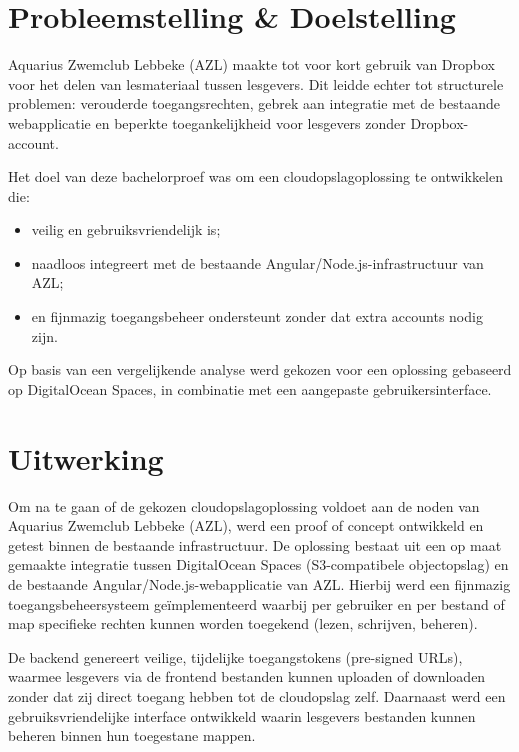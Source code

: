 \documentclass[a0,portrait]{hogent-poster}
\begin{document}
\begin{multicols}{2} %

\section{Probleemstelling \& Doelstelling}  

Aquarius Zwemclub Lebbeke (AZL) maakte tot voor kort gebruik van Dropbox voor het delen van lesmateriaal tussen lesgevers. Dit leidde echter tot structurele problemen: verouderde toegangsrechten, gebrek aan integratie met de bestaande webapplicatie en beperkte toegankelijkheid voor lesgevers zonder Dropbox-account.

Het doel van deze bachelorproef was om een cloudopslagoplossing te ontwikkelen die:
\begin{itemize}
  \item veilig en gebruiksvriendelijk is;
  \item naadloos integreert met de bestaande Angular/Node.js-infrastructuur van AZL;
  \item en fijnmazig toegangsbeheer ondersteunt zonder dat extra accounts nodig zijn.
\end{itemize}

Op basis van een vergelijkende analyse werd gekozen voor een oplossing gebaseerd op DigitalOcean Spaces, in combinatie met een aangepaste gebruikersinterface.

\section{Uitwerking}

Om na te gaan of de gekozen cloudopslagoplossing voldoet aan de noden van Aquarius Zwemclub Lebbeke (AZL), 
werd een proof of concept ontwikkeld en getest binnen de bestaande infrastructuur. De oplossing bestaat uit een op maat gemaakte 
integratie tussen DigitalOcean Spaces (S3-compatibele objectopslag) en de bestaande Angular/Node.js-webapplicatie van AZL. 
Hierbij werd een fijnmazig toegangsbeheersysteem geïmplementeerd waarbij per gebruiker en per bestand of map specifieke rechten 
kunnen worden toegekend (lezen, schrijven, beheren).

De backend genereert veilige, tijdelijke toegangstokens (pre-signed URLs), waarmee lesgevers via de frontend bestanden kunnen uploaden of downloaden 
zonder dat zij direct toegang hebben tot de cloudopslag zelf. Daarnaast werd een gebruiksvriendelijke interface ontwikkeld waarin lesgevers bestanden 
kunnen beheren binnen hun toegestane mappen.


\end{multicols}
\end{document}

